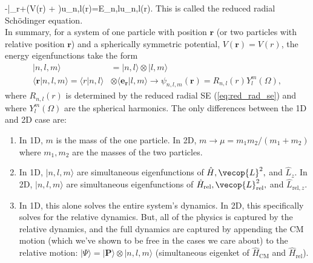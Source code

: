 \be
	-\bigg|_{r}+\left(V(r) + \right)u_{n,l}(r)=E_{n,l}u_{n,l}(r)\label{eq:red_rad_se}.
\ee
This is called the reduced radial Sch{\"o}dinger equation.\\

In summary, for a system of one particle with position $\mathbf{r}$ (or two particles with relative position $\mathbf{r}$) and a spherically symmetric potential, $V(\mathbf{r})=V(r)$, the energy eigenfunctions take the form
\begin{align*}
    |n,l,m\rangle&=|n,l\rangle\otimes|l,m\rangle\\
    \langle\mathbf{r}|n,l,m\rangle = \langle r|n,l\rangle&\otimes \langle \mathbf{e}_\mathbf{r}|l,m\rangle\rightarrow \psi_{n,l,m}(\mathbf{r})=R_{n,l}(r)Y^m_l(\Omega),
\end{align*}
where $R_{n,l}(r)$ is determined by the reduced radial SE (\cref{eq:red_rad_se}) and where $Y^m_l(\Omega)$ are the spherical harmonics. The only differences between the 1D and 2D case are:
\begin{enumerate}
    \item In 1D, $m$ is the mass of the one particle. In 2D, $m\rightarrow\mu=m_1m_2/(m_1+m_2)$ where $m_1, m_2$ are the masses of the two particles.
    \item In 1D, $|n,l,m\rangle$ are simultaneous eigenfunctions of $\hat{H},\vecop{L}^2,$ and $\hat{L}_z$. In 2D, $|n,l,m\rangle$ are simultaneous eigenfunctions of $\hat{H}_\text{rel},\vecop{L}^2_\text{rel},$ and $\hat{L}_{\text{rel},z}$.
    \item In 1D, this alone solves the entire system's dynamics. In 2D, this specifically solves for the relative dynamics. But, all of the physics is captured by the relative dynamics, and the full dynamics are captured by appending the CM motion (which we've shown to be free in the cases we care about) to the relative motion: $|\Psi\rangle=|\mathbf{P}\rangle\otimes|n,l,m\rangle$ (simultaneous eigenket of $\hat{H}_\text{CM}$ and $\hat{H}_\text{rel}$).
\end{enumerate}